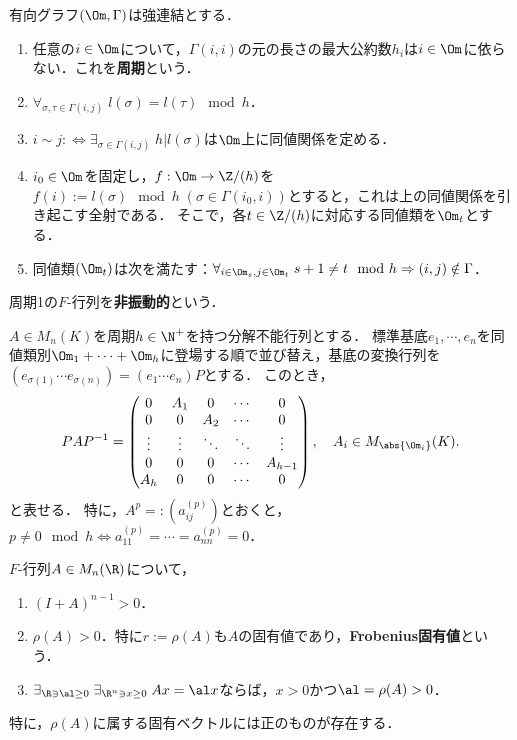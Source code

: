 \documentclass[uplatex, dvipdfmx]{jsreport}
\begin{document}
\begin{lemma}[強連結な有向グラフの周期]
    有向グラフ$(\Om,\Gamma)$は強連結とする．
    \begin{enumerate}
        \item 任意の$i\in\Om$について，$\Gamma(i,i)$の元の長さの最大公約数$h_i$は$i\in\Om$に依らない．これを\textbf{周期}という．
        \item $\forall_{\sigma,\tau\in\Gamma(i,j)}\;l(\sigma)=l(\tau)\mod h$．
        \item $i\sim j:\Leftrightarrow\exists_{\sigma\in\Gamma(i,j)}\;h|l(\sigma)$は$\Om$上に同値関係を定める．
        \item $i_0\in\Om$を固定し，$f:\Om\to\Z/(h)$を$f(i):=l(\sigma)\mod h\;(\sigma\in\Gamma(i_0,i))$とすると，これは上の同値関係を引き起こす全射である．
        そこで，各$t\in\Z/(h)$に対応する同値類を$\Om_t$とする．
        \item 同値類$(\Om_t)$は次を満たす：$\forall_{i\in\Om_s,j\in\Om_t}\;s+1\ne t\mod h\Rightarrow (i,j)\notin\Gamma$．
    \end{enumerate}
    周期1の$F$-行列を\textbf{非振動的}という．
\end{lemma}

\begin{theorem}[周期標準形]
    $A\in M_n(K)$を周期$h\in\N^+$を持つ分解不能行列とする．
    標準基底$e_1,\cdots,e_n$を同値類別$\Om_1+\cdots+\Om_h$に登場する順で並び替え，基底の変換行列を$(e_{\sigma(1)}\cdots e_{\sigma(n)})=(e_1\cdots e_n)P$とする．
    このとき，
    \[PAP^{-1}=\begin{pmatrix}0&A_1&0&\cdots&0\\0&0&A_2&\cdots&0\\\vdots&\vdots&\ddots&\ddots&\vdots\\0&0&0&\cdots&A_{h-1}\\A_h&0&0&\cdots&0\end{pmatrix},\quad A_i\in M_{\abs{\Om_i}}(K).\]
    と表せる．
    特に，$A^p=:(a_{ij}^{(p)})$とおくと，$p\ne0\mod h\Leftrightarrow a_{11}^{(p)}=\cdots=a_{nn}^{(p)}=0$．
\end{theorem}

\begin{theorem}[Frobenius根の性質]
    $F$-行列$A\in M_n(\R)$について，
    \begin{enumerate}
        \item $(I+A)^{n-1}>0$．
        \item $\rho(A)>0$．特に$r:=\rho(A)$も$A$の固有値であり，\textbf{Frobenius固有値}という．
        \item $\exists_{\R\ni\al\ge0}\;\exists_{\R^n\ni x\ge0}\;Ax=\al x$ならば，$x>0$かつ$\al=\rho(A)>0$．
    \end{enumerate}
    特に，$\rho(A)$に属する固有ベクトルには正のものが存在する．
\end{theorem}
\end{document}
